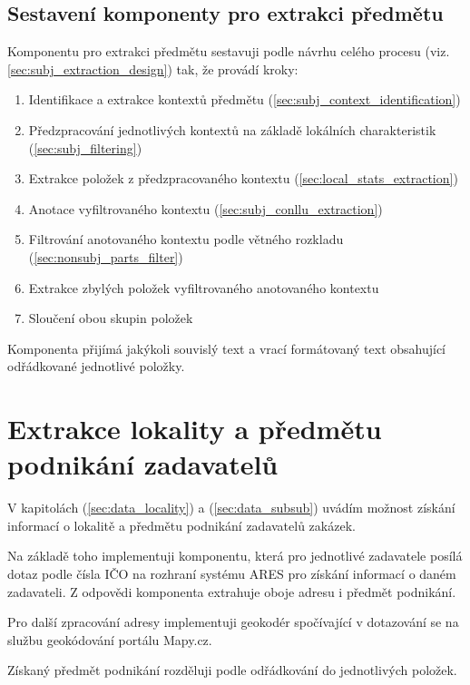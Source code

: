 \documentclass[thesis=M,czech]{FITthesis}[2019/12/23]
\begin{document}
\subsection{Sestavení komponenty pro extrakci předmětu}

Komponentu pro extrakci předmětu sestavuji podle návrhu celého procesu (viz. \ref{sec:subj_extraction_design}) tak, že provádí kroky:
\begin{enumerate}
    \item Identifikace a extrakce kontextů předmětu (\ref{sec:subj_context_identification})
    \item Předzpracování jednotlivých kontextů na základě lokálních charakteristik (\ref{sec:subj_filtering})
    \item Extrakce položek z předzpracovaného kontextu
    (\ref{sec:local_stats_extraction})
    \item Anotace vyfiltrovaného kontextu (\ref{sec:subj_conllu_extraction})
    \item Filtrování anotovaného kontextu podle větného rozkladu (\ref{sec:nonsubj_parts_filter})
    \item Extrakce zbylých položek vyfiltrovaného anotovaného kontextu
    \item Sloučení obou skupin položek
\end{enumerate}

Komponenta přijímá jakýkoli souvislý text a vrací formátovaný text obsahující odřádkované jednotlivé položky.
\newpage

\section{Extrakce lokality a předmětu podnikání zadavatelů}
\label{sec:locality&subsub_extraction}

V kapitolách (\ref{sec:data_locality}) a (\ref{sec:data_subsub}) uvádím možnost získání informací o lokalitě a předmětu podnikání zadavatelů zakázek.

Na základě toho implementuji komponentu, která pro jednotlivé zadavatele posílá dotaz podle čísla IČO na rozhraní systému ARES pro získání informací o daném zadavateli. Z odpovědi komponenta extrahuje oboje adresu i předmět podnikání.

Pro další zpracování adresy implementuji geokodér spočívající v dotazování se na službu geokódování portálu Mapy.cz.

Získaný předmět podnikání rozděluji podle odřádkování do jednotlivých položek.
\end{document}
